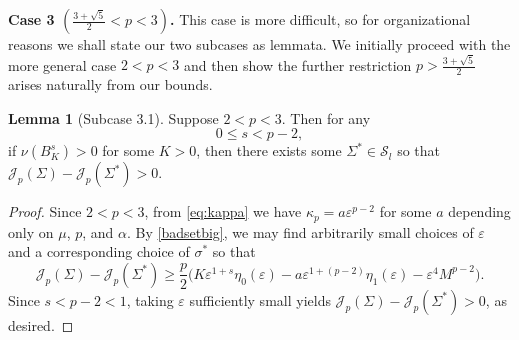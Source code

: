 \documentclass[preprint, reqno]{amsart}
\renewcommand{\epsilon}{\varepsilon}
\theoremstyle{definition}
\newtheorem{lemma}[definition]{Lemma}
\numberwithin{equation}{section}
\begin{document}
\medskip

\textbf{Case 3 $({\frac{3 + \sqrt 5}{2}} < p < 3)$.} This case is more
difficult, so for organizational reasons we shall state our two
subcases as lemmata. We initially proceed with the more general case
$2 < p < 3$ and then show the further restriction $p > \frac{3 + \sqrt
  5}{2}$ arises naturally from our bounds.

\begin{lemma}[Subcase 3.1]\label{ssmall}
  Suppose $2 < p < 3$. Then for any
  \[
    0 \leq s < p-2,
  \]
  if $\nu(B_K^s) > 0$ for some $K > 0$, then there exists some
  $\Sigma^* \in \mathcal{S}_l$ so that $\mathscr{J}_p(\Sigma) -
  \mathscr{J}_p(\Sigma^*) > 0$.
\end{lemma}

\begin{proof}
  Since $2< p < 3$, from \eqref{eq:kappa} we have $\kappa_p =
  a\epsilon^{p-2}$ for some $a$ depending only on $\mu$, $p$, and
  $\alpha$. By \cref{badsetbig}, we may find arbitrarily small choices
  of $\epsilon$ and a corresponding choice of $\sigma^*$ so that
  \[
    \mathscr{J}_p(\Sigma) - \mathscr{J}_p(\Sigma^*) \geq \frac{p}{2}
    \Big(K \epsilon^{1 + s}\eta_0(\epsilon) -
    a\epsilon^{1+(p-2)}\eta_1(\epsilon) - \epsilon^4 M^{p-2} \Big).
  \]
  Since $s < p-2 < 1$, taking $\epsilon$ sufficiently small yields
  $\mathscr{J}_p(\Sigma) - \mathscr{J}_p(\Sigma^*) > 0$, as desired.
\end{proof}
\end{document}

